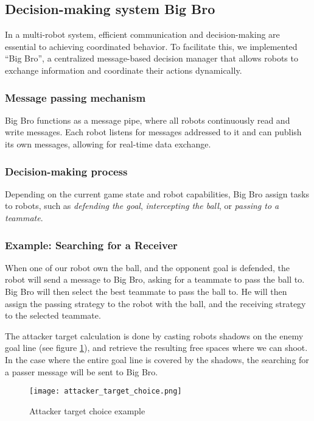 \subsection{Decision-making system Big Bro}

In a multi-robot system, efficient communication and decision-making are essential to achieving coordinated behavior. To facilitate this, we implemented ``Big Bro'', a centralized message-based decision manager that allows robots to exchange information and coordinate their actions dynamically.  

\subsubsection{Message passing mechanism}

Big Bro functions as a message pipe, where all robots continuously read and write messages. Each robot listens for messages addressed to it and can publish its own messages, allowing for real-time data exchange.

\subsubsection{Decision-making process}

Depending on the current game state and robot capabilities, Big Bro assign tasks to robots, such as \textit{defending the goal}, \textit{intercepting the ball}, or \textit{passing to a teammate}.

\subsubsection{Example: Searching for a Receiver}

When one of our robot own the ball, and the opponent goal is defended, the robot will send a message to Big Bro, asking for a teammate to pass the ball to. Big Bro will then select the best teammate to pass the ball to. He will then assign the passing strategy to the robot with the ball, and the receiving strategy to the selected teammate.

The attacker target calculation is done by casting robots shadows on the enemy goal line (see figure \ref{fig:attacker_target_choice}), and retrieve the resulting free spaces where we can shoot.
In the case where the entire goal line is covered by the shadows, the searching for a passer message will be sent to Big Bro.
\begin{figure}
\centering
    \texttt{[image: attacker\_target\_choice.png]}
    \caption{Attacker target choice example}
    \label{fig:attacker_target_choice}
\end{figure}

